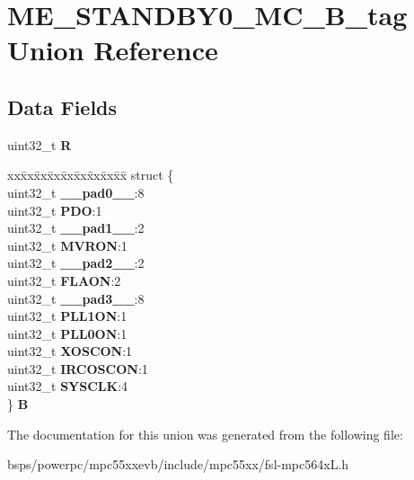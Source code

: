 \hypertarget{unionME__STANDBY0__MC__32B__tag}{}\section{M\+E\+\_\+\+S\+T\+A\+N\+D\+B\+Y0\+\_\+\+M\+C\+\_\+B\+\_\+tag Union Reference}
\label{unionME__STANDBY0__MC__32B__tag}
\subsection*{Data Fields}
\begin{DoxyCompactItemize}
\item 
\mbox{\label{unionME__STANDBY0__MC__32B__tag_adafe618e623394bc761254085e6b3d4c}} 
uint32\+\_\+t {\bfseries R}
\item 
\mbox{\label{unionME__STANDBY0__MC__32B__tag_a01c9b9b8fa18e111e829ee02cc7608d0}} 
\begin{tabbing}
xx\=xx\=xx\=xx\=xx\=xx\=xx\=xx\=xx\=\kill
struct \{\\
\>uint32\_t {\bfseries \_\_pad0\_\_}:8\\
\>uint32\_t {\bfseries PDO}:1\\
\>uint32\_t {\bfseries \_\_pad1\_\_}:2\\
\>uint32\_t {\bfseries MVRON}:1\\
\>uint32\_t {\bfseries \_\_pad2\_\_}:2\\
\>uint32\_t {\bfseries FLAON}:2\\
\>uint32\_t {\bfseries \_\_pad3\_\_}:8\\
\>uint32\_t {\bfseries PLL1ON}:1\\
\>uint32\_t {\bfseries PLL0ON}:1\\
\>uint32\_t {\bfseries XOSCON}:1\\
\>uint32\_t {\bfseries IRCOSCON}:1\\
\>uint32\_t {\bfseries SYSCLK}:4\\
\} {\bfseries B}\\

\end{tabbing}\end{DoxyCompactItemize}


The documentation for this union was generated from the following file\+:\begin{DoxyCompactItemize}
\item 
bsps/powerpc/mpc55xxevb/include/mpc55xx/fsl-\/mpc564x\+L.\+h\end{DoxyCompactItemize}
